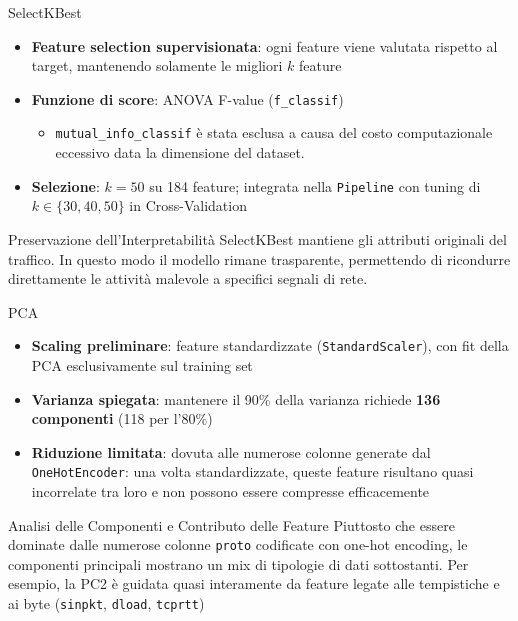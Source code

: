 \documentclass{beamer}
\begin{document}
\begin{frame}{SelectKBest}
  \begin{itemize}
    \item \textbf{Feature selection supervisionata}: ogni feature viene valutata rispetto al target, mantenendo solamente le migliori $k$ feature
\item \textbf{Funzione di score}: ANOVA F-value (\texttt{f\_classif})
      \begin{itemize}
        \item \texttt{mutual\_info\_classif} è stata esclusa a causa del costo computazionale eccessivo data la dimensione del dataset.
      \end{itemize}
    \item \textbf{Selezione}: $k = 50$ su 184 feature; integrata nella \texttt{Pipeline} con tuning di $k \in \{30, 40, 50\}$ in Cross-Validation
  \end{itemize}
  \vspace{0.3cm}
  \begin{block}{Preservazione dell'Interpretabilità}
    SelectKBest mantiene gli attributi originali del traffico. In questo modo il modello rimane trasparente, permettendo di ricondurre direttamente le attività malevole a specifici segnali di rete.
  \end{block}
\end{frame}

\begin{frame}{PCA}
  \begin{itemize}
    \item \textbf{Scaling preliminare}: feature standardizzate (\texttt{StandardScaler}), con fit della PCA esclusivamente 
      sul training set
    \item \textbf{Varianza spiegata}: mantenere il 90\% della varianza richiede \textbf{136 componenti} (118 per l'80\%) 
    \item \textbf{Riduzione limitata}: dovuta alle numerose colonne generate dal \texttt{OneHotEncoder}: una volta standardizzate, queste feature risultano quasi incorrelate tra loro e non possono essere compresse efficacemente
  \end{itemize}
  \begin{block}{Analisi delle Componenti e Contributo delle Feature}
    Piuttosto che essere dominate dalle numerose colonne \texttt{proto} codificate con one-hot encoding, le componenti principali mostrano un mix di tipologie di dati sottostanti. Per esempio, la PC2 è guidata quasi interamente da feature legate alle tempistiche e ai byte (\texttt{sinpkt}, \texttt{dload}, \texttt{tcprtt})
  \end{block}
\end{frame}
\end{document}
